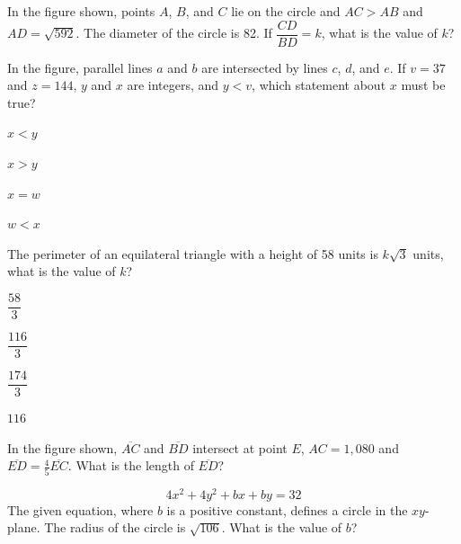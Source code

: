 \vfill
\noindent\begin{minipage}{\linewidth}
\par\smallskip
In the figure shown, points $A$, $B$, and $C$ lie on the circle and $AC>AB$ and $AD=\sqrt{592}$. The diameter of the circle is 82. If $\dfrac{CD}{BD}=k$, what is the value of $k$?
\satfig{\figcircleabcdii}
\satnotetoscale
\end{minipage}
\vfill
\clearpage
\noindent\begin{minipage}{\linewidth}
\par\smallskip
In the figure, parallel lines $a$ and $b$ are intersected by lines $c$, $d$, and $e$. If $v=37$ and $z=144$, $y$ and $x$ are integers, and $y<v$, which statement about $x$ must be true?
\satfig{\figparallelabcdeii}
\satnotetoscale
\begin{satchoices}
  \item[A)] $x<y$
  \item[B)] $x>y$
  \item[C)] $x=w$
  \item[D)] $w<x$
\end{satchoices}
\end{minipage}
\vfill
\noindent\begin{minipage}{\linewidth}
\par\smallskip
The perimeter of an equilateral triangle with a height of 58 units is $k\sqrt{3}$ units, what is the value of $k$?
\begin{satchoices}
  \item[A)] $\dfrac{58}{3}$
  \item[B)] $\dfrac{116}{3}$
  \item[C)] $\dfrac{174}{3}$
  \item[D)] $116$
\end{satchoices}
\end{minipage}
\vfill
\noindent\begin{minipage}{\linewidth}
\par\smallskip
In the figure shown, $\overline{AC}$ and $\overline{BD}$ intersect at point $E$, $AC=1{,}080$ and $\overline{ED}=\frac{4}{5}\overline{EC}$. What is the length of $\overline{ED}$?
\satfig{\figbowtieii}
\satnotetoscale
\end{minipage}
\vfill
\clearpage
\noindent\begin{minipage}{\linewidth}
\par\smallskip
$$4x^2+4y^2+bx+by=32$$ The given equation, where $b$ is a positive constant, defines a circle in the $xy$-plane. The radius of the circle is $\sqrt{106}$. What is the value of $b$?
\end{minipage}
